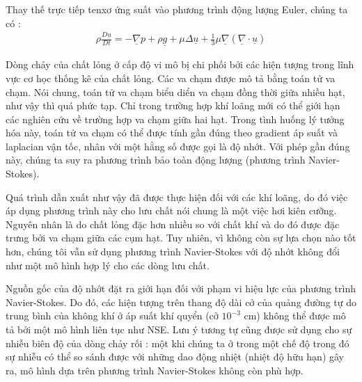 \documentclass[CO_LUU_CHAT_NANG_CAO.tex]{subfiles}
\begin{document}
Thay thế trực tiếp tenxơ ứng suất vào phương trình động lượng Euler, chúng ta có :
\begin{equation}\label{NAVIER_STOKES_E}
    \begin{aligned}
        \rho \frac{D\underline{u}}{{Dt}} =  - \underline{\nabla} p + \rho\underline{g} + \mu \Delta \underline u  + \frac{1}{3}\mu \underline \nabla  \left( {\underline \nabla   \cdot \underline u } \right)
    \end{aligned}
\end{equation}

Dòng chảy của chất lỏng ở cấp độ vi mô bị chi phối bởi các hiện tượng trong lĩnh vực cơ học thống kê của chất lỏng. Các va chạm được mô tả bằng toán tử va chạm. Nói chung, toán tử va chạm biểu diển va chạm đồng thời giữa nhiều hạt, như vậy thì quá phức tạp. Chỉ trong trường hợp khí loãng mới có thể giới hạn các nghiên cứu về trường hợp va chạm giữa hai hạt. Trong tình huống lý tưởng hóa này, toán tử va chạm có thể được tính gần đúng theo gradient áp suất và laplacian vận tốc, nhân với một hằng số được gọi là độ nhớt. Với phép gần đúng này, chúng ta suy ra phương trình bảo toàn động lượng (phương trình Navier-Stokes).

Quá trình dẫn xuất như vậy đã được thực hiện đối với các khí loãng, do đó việc áp dụng phương trình này cho lưu chất nói chung là một việc hơi kiên cưỡng. Nguyên nhân là do chất lỏng đặc hơn nhiều so với chất khí và do đó được đặc trưng bởi va chạm giữa các cụm hạt. Tuy nhiên, vì không còn sự lựa chọn nào tốt hơn, chúng tôi vẫn sử dụng phương trình Navier-Stokes với độ nhớt không đổi như một mô hình hợp lý cho các dòng lưu chất.

Nguồn gốc của độ nhớt đặt ra giới hạn đối với phạm vi hiệu lực của phương trình Navier-Stokes. Do đó, các hiện tượng trên thang độ dài cở của quảng đường tự do trung bình của không khí ở áp suất khí quyển (cở $10^{-3}$ cm) không thể được mô tả bởi một mô hình liên tục như NSE. Lưu ý tương tự cũng được sử dụng cho sự nhiễu biên độ của dòng chảy rối : một khi chúng ta ở trong một chế độ trong đó sự nhiễu có thể so sánh được với những dao động nhiệt (nhiệt độ hữu hạn) gây ra, mô hình dựa trên phương trình Navier-Stokes không còn phù hợp.
\end{document}
